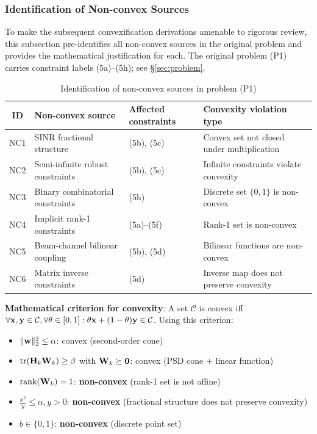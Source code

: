 \subsubsection{Identification of Non-convex Sources}

To make the subsequent convexification derivations amenable to rigorous review, this subsection pre-identifies all non-convex sources in the original problem and provides the mathematical justification for each. The original problem (P1) carries constraint labels (5a)--(5h); see \S\ref{sec:problem}.

\begin{table}[htbp]
\centering
\caption{Identification of non-convex sources in problem (P1)}\label{tab:nonconvex_sources}
\begin{tabular}{clll}
\toprule
ID & Non-convex source & Affected constraints & Convexity violation type \\
\midrule
NC1 & SINR fractional structure & (5b), (5c) & Convex set not closed under multiplication \\
NC2 & Semi-infinite robust constraints & (5b), (5c) & Infinite constraints violate convexity \\
NC3 & Binary combinatorial constraints & (5h) & Discrete set $\{0,1\}$ is non-convex \\
NC4 & Implicit rank-1 constraints & (5a)--(5f) & Rank-1 set is non-convex \\
NC5 & Beam-channel bilinear coupling & (5b), (5d) & Bilinear functions are non-convex \\
NC6 & Matrix inverse constraints & (5d) & Inverse map does not preserve convexity \\
\bottomrule
\end{tabular}
\end{table}

\textbf{Mathematical criterion for convexity}: A set $\mathcal{C}$ is convex iff $\forall \mathbf{x},\mathbf{y}\in\mathcal{C},\forall \theta\in[0,1]: \theta\mathbf{x}+(1-\theta)\mathbf{y}\in\mathcal{C}$. Using this criterion:

\begin{itemize}
    \item $\|\mathbf{w}\|_2^2 \leq \alpha$: convex (second-order cone)
    \item $\text{tr}(\mathbf{H}_k \mathbf{W}_k) \geq \beta$ with $\mathbf{W}_k \succeq \mathbf{0}$: convex (PSD cone + linear function)
    \item $\operatorname{rank}(\mathbf{W}_k) = 1$: \textbf{non-convex} (rank-1 set is not affine)
    \item $\frac{x^2}{y} \leq \alpha, y > 0$: \textbf{non-convex} (fractional structure does not preserve convexity)
    \item $b \in \{0,1\}$: \textbf{non-convex} (discrete point set)
\end{itemize}

